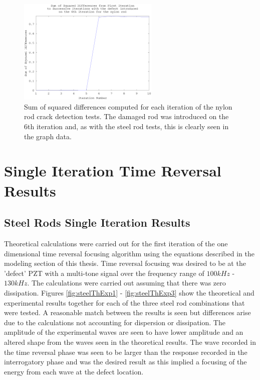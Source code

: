 \begin{figure}[ht!]
\centering
\includegraphics[width=0.6\textwidth]{eps_pics/nylonDifferences}
\caption{Sum of squared differences computed for each iteration of the nylon rod crack detection tests. The damaged rod was introduced on the 6th iteration and, as with the steel rod tests, this is clearly seen in the graph data.
 	 \label{fig:nylonDifferences}} 
\end{figure}

\section{Single Iteration Time Reversal Results}

\subsection{Steel Rods Single Iteration Results}
Theoretical calculations were carried out for the first iteration of the one dimensional time reversal focusing algorithm using the equations described in the modeling section of this thesis. Time reversal focusing was desired to be at the 'defect' PZT with a multi-tone signal over the frequency range of $100 kHz$ - $130 kHz$. The calculations were carried out assuming that there was zero dissipation. Figures \ref{fig:steelThExp1} - \ref{fig:steelThExp3} show the theoretical and experimental results together for each of the three steel rod combinations that were tested. A reasonable match between the results is seen but differences arise due to the calculations not accounting for dispersion or dissipation. The amplitude of the experimental waves are seen to have lower amplitude and an altered shape from the waves seen in the theoretical results. The wave recorded in the time reversal phase was seen to be larger than the response recorded in the interrogatory phase and was the desired result as this implied a focusing of the energy from each wave at the defect location.

